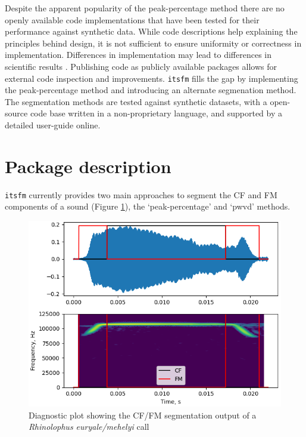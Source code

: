 \documentclass[
]{book}
\begin{document}
Despite the apparent popularity of the peak-percentage method there are no openly available code implementations that have been tested for their performance against synthetic data. While code descriptions help explaining the principles behind design, it is not sufficient to ensure uniformity or correctness in implementation. Differences in implementation may lead to differences in scientific results \citep{bakervincent2019, mcfee2018open}. Publishing code as publicly available packages allows for external code inspection and improvements. \texttt{itsfm} fills the gap by implementing the peak-percentage method and introducing an alternate segmenation method. The segmentation methods are tested against synthetic datasets, with a open-source code base written in a non-proprietary language, and supported by a detailed user-guide online.

\hypertarget{package-description}{%
\section{Package description}\label{package-description}}

\texttt{itsfm} currently provides two main approaches to segment the CF and FM components of a sound (Figure \ref{fig:cffmseg}), the `peak-percentage' and `pwvd' methods.

\begin{figure}
\includegraphics[width=1\linewidth]{original_papers/itsfm-paper/figures/pwvd_cffm_segmentation} \caption{Diagnostic plot showing the CF/FM segmentation output of a \textit{Rhinolophus euryale/mehelyi} call}\label{fig:cffmseg}
\end{figure}
\end{document}
